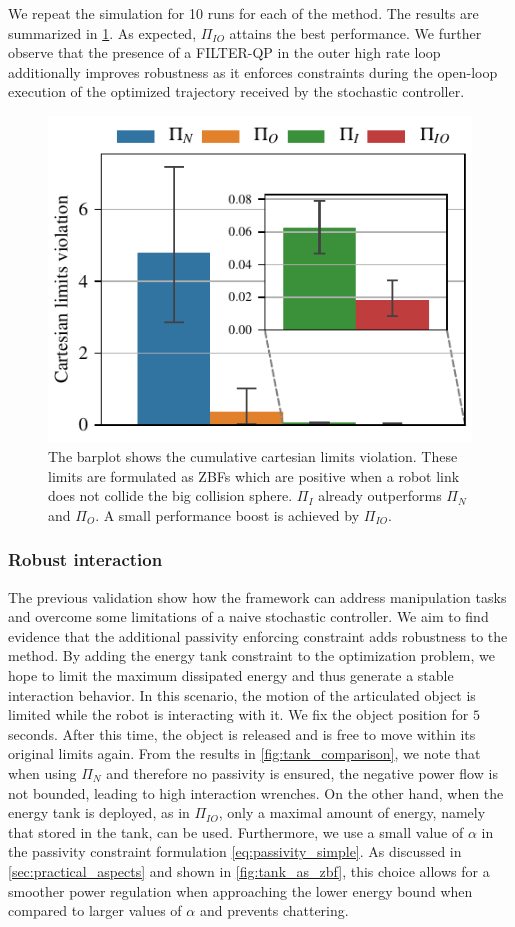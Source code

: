We repeat the simulation for 10 runs for each of the method. The results are summarized in \fig \ref{fig:obstacle_avoidance}. As expected, $\Pi_{IO}$ attains the best performance. We further observe that the presence of a FILTER-QP in the outer high rate loop additionally improves robustness as it enforces constraints during the open-loop execution of the optimized trajectory received by the stochastic controller. 
\begin{figure}[t]
    \centering
    \includegraphics[width=0.7\columnwidth]{figures/obstacle_avoidance/obstacle_avoidance_test.pdf}
    \caption{The barplot shows the cumulative cartesian limits violation. These limits are formulated as ZBFs which are positive when a robot link does not collide the big collision sphere. $\Pi_{I}$ already outperforms $\Pi_{N}$ and $\Pi_{O}$. A small performance boost is achieved by $\Pi_{IO}$.}
    \label{fig:obstacle_avoidance}
\end{figure}

\vspace{0.3cm}
\subsubsection{Robust interaction}
The previous validation show how the framework can address manipulation tasks and overcome some limitations of a naive stochastic controller. We aim to find evidence that the additional passivity enforcing constraint adds robustness to the method. By adding the energy tank constraint to the optimization problem, we hope to limit the maximum dissipated energy and thus generate a stable interaction behavior. In this scenario, the motion of the articulated object is limited while the robot is interacting with it. We fix the object position for $5$ seconds. After this time, the object is released and is free to move within its original limits again. From the results in \fig \ref{fig:tank_comparison}, we note that when using $\Pi_{N}$ and therefore no passivity is ensured, the negative power flow is not bounded, leading to high interaction wrenches. On the other hand, when the energy tank is deployed, as in $\Pi_{IO}$, only a maximal amount of energy, namely that stored in the tank, can be used. Furthermore, we use a small value of $\alpha$ in the passivity constraint formulation \eqref{eq:passivity_simple}. As discussed in \sect \ref{sec:practical_aspects} and shown in \fig \ref{fig:tank_as_zbf}, this choice allows for a smoother power regulation when approaching the lower energy bound when compared to larger values of $\alpha$ and prevents chattering. 

